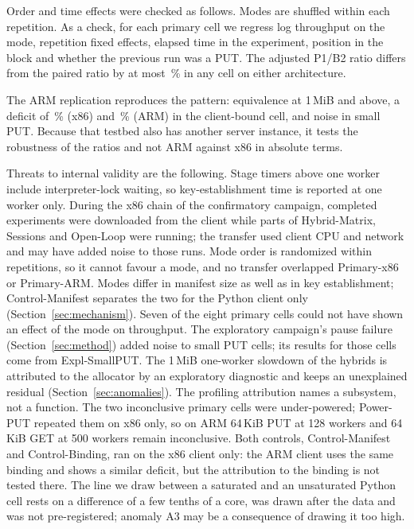 \documentclass[review,12pt]{elsarticle}
\newcommand{\lab}[1]{\textsf{#1}}
\begin{document}
Order and time effects were checked as follows. Modes are shuffled within each repetition. As a check, for each primary cell we regress log
throughput on the mode, repetition fixed effects, elapsed time in the experiment, position in the
block and whether the previous run was a PUT. The adjusted P1/B2 ratio differs from the paired
ratio by at most \RevOrderShiftMax\,\% in any cell on either architecture.

The ARM replication reproduces the pattern: equivalence at 1\,MiB and above, a deficit of
\RevHotDeficit\,\% (x86) and \ArmHotDeficit\,\% (ARM) in the client-bound cell, and noise in small PUT. Because that testbed also has another server
instance, it tests the robustness of the ratios and not ARM against x86 in absolute terms.

Threats to internal validity are the following. Stage timers above one worker include interpreter-lock waiting, so
key-establishment time is reported at one worker only. During the x86 chain of the confirmatory
campaign, completed experiments were downloaded from the client while parts of
\lab{Hybrid-Matrix}, \lab{Sessions} and \lab{Open-Loop} were running; the transfer used client CPU and network and may have added noise to those runs.
Mode order is randomized within repetitions, so it cannot favour a mode, and no transfer
overlapped \lab{Primary-x86} or \lab{Primary-ARM}. Modes differ in manifest size as well as
in key establishment; \lab{Control-Manifest} separates the two for the Python client only
(Section~\ref{sec:mechanism}). Seven of the eight primary cells could not have shown an effect
of the mode on throughput. The exploratory campaign's pause failure
(Section~\ref{sec:method}) added noise to small PUT cells; its results for those cells come from
\lab{Expl-SmallPUT}. The 1\,MiB one-worker slowdown of the hybrids is attributed to the allocator by an exploratory
diagnostic and keeps an unexplained residual (Section~\ref{sec:anomalies}). The profiling
attribution names a subsystem, not a function. The two inconclusive primary cells were
under-powered; \lab{Power-PUT} repeated them on x86 only, so on ARM 64\,KiB PUT at 128 workers
and 64\,KiB GET at 500 workers remain inconclusive. Both controls,
\lab{Control-Manifest} and \lab{Control-Binding}, ran on the x86 client only: the ARM client
uses the same binding and shows a similar deficit, but the attribution to the binding is not
tested there. The line we draw between a saturated and an unsaturated Python cell rests on a
difference of a few tenths of a core, was drawn after the data and was not pre-registered;
anomaly A3 may be a consequence of drawing it too high.
\end{document}
